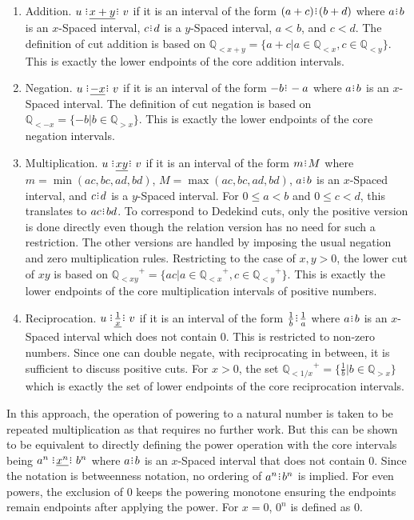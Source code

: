 \documentclass[12pt]{article}
\newcommand{\qcut}[2][x]{\ensuremath{\mathbb{Q}_{#2 #1}}}
\newcommand{\qlt}[1][x]{\qcut[#1]{<}}
\newcommand{\qgt}[1][x]{\qcut[#1]{>}}
\begin{document}
\begin{enumerate}
    \item Addition. $u \xrel[x+y] v$ if it is an interval of the form $(a+c)\rint (b+d)$ where $a \rint b$ is an $x$-Spaced interval, $c\rint d$ is a $y$-Spaced interval, $a < b$, and $c < d$. The definition of cut addition is based on $\qlt[x+y] = \{a + c | a \in \qlt, c \in \qlt[y]\} $. This is exactly the lower endpoints of the core addition intervals. 
    \item Negation. $u \xrel[-x] v$ if it is an interval of the form $-b\rint -a$ where $a \rint b$ is an $x$-Spaced interval. The definition of cut negation is based on $\qlt[-x] = \{-b | b \in \qgt\}$. This is exactly the lower endpoints of the core negation intervals. 
    \item Multiplication. $u \xrel[xy] v$  if it is an interval of the form $m\rint M$ where $m = \min(ac, bc, ad, bd)$, $M = \max(ac, bc, ad, bd)$, $a \rint b$ is an $x$-Spaced interval, and $c\rint d$ is a $y$-Spaced interval. For $0 \leq a < b$ and $0 \leq c < d$, this translates to $ac\rint bd$. To correspond to Dedekind cuts, only the positive version is done directly even though the relation version has no need for such a restriction. The other versions are handled by imposing the usual negation and zero multiplication rules. Restricting to the case of $x , y > 0$, the lower cut of $xy$ is based on $\qlt[xy]^+ = \{ac | a \in \qlt^+, c \in \qlt[y]^+ \}$. This is exactly the lower endpoints of the core multiplication intervals of positive numbers. 
    \item Reciprocation. $u \xrel[\frac{1}{x}] v$ if it is an interval of the form $\frac{1}{b}\rint \frac{1}{a}$ where $a \rint b$ is an $x$-Spaced interval which does not contain 0. This is restricted to non-zero numbers. Since one can double negate, with reciprocating in between, it is sufficient to discuss positive cuts. For $x> 0$, the set $\qlt[1/x]^+ = \{\frac{1}{b} | b \in \qgt\}$ which is exactly the set of lower endpoints of the core reciprocation intervals. 
\end{enumerate}


In this approach, the operation of powering to a natural number is taken to be repeated multiplication as that requires no further work. But this can be shown to be equivalent to directly defining the power operation with the core intervals being $a^n \xrel[x^n] b^n$ where $a \rint b$ is an $x$-Spaced interval that does not contain 0. Since the notation is betweenness notation, no ordering of $a^n \rint b^n$ is implied. For even powers, the exclusion of 0 keeps the powering monotone ensuring the endpoints remain endpoints after applying the power. For $x = 0$, $0^n$ is defined as $0$. 
\end{document}
